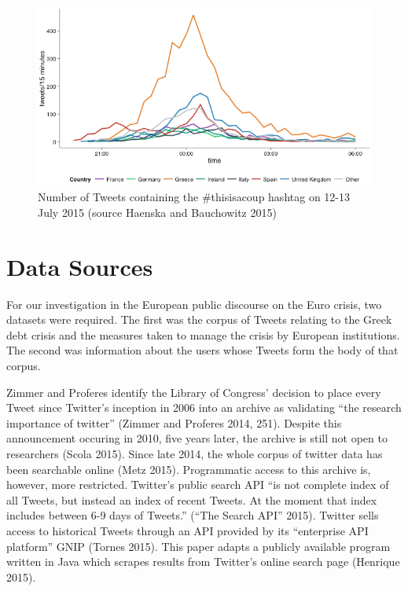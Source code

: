\documentclass[]{article}
\begin{document}
\begin{figure}[htbp]
\centering
\includegraphics{../../img/Greece-twitter-2.png}
\caption{Number of Tweets containing the \#thisisacoup hashtag on 12-13
July 2015 (source Haenska and Bauchowitz 2015)}
\end{figure}

\section{Data Sources}\label{data-sources}

For our investigation in the European public discourse on the Euro
crisis, two datasets were required. The first was the corpus of Tweets
relating to the Greek debt crisis and the measures taken to manage the
crisis by European institutions. The second was information about the
users whose Tweets form the body of that corpus.

Zimmer and Proferes identify the Library of Congress' decision to place
every Tweet since Twitter's inception in 2006 into an archive as
validating ``the research importance of twitter'' (Zimmer and Proferes
2014, 251). Despite this announcement occuring in 2010, five years
later, the archive is still not open to researchers (Scola 2015). Since
late 2014, the whole corpus of twitter data has been searchable online
(Metz 2015). Programmatic access to this archive is, however, more
restricted. Twitter's public search API ``is not complete index of all
Tweets, but instead an index of recent Tweets. At the moment that index
includes between 6-9 days of Tweets.'' (``The Search API'' 2015).
Twitter sells access to historical Tweets through an API provided by its
``enterprise API platform'' GNIP (Tornes 2015). This paper adapts a
publicly available program written in Java which scrapes results from
Twitter's online search page (Henrique 2015).
\end{document}
